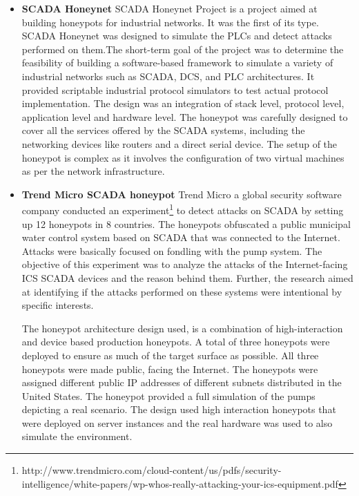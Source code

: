 \documentclass[article,msc=informatik,type=msc,colorback,accentcolor=tud9c]{tudthesis}
\begin{document}
	
	\vspace{5mm} 
	\begin{itemize}
	\item\textbf{SCADA Honeynet}
	SCADA Honeynet Project\cite{5198796} is a project aimed at building honeypots for industrial networks. It was the first of its type. \ac{SCADA} Honeynet was designed to simulate the \ac{PLC}s and detect attacks performed on them.The short-term goal of the project was to determine the feasibility of building a software-based framework to simulate a variety of industrial networks such as \ac{SCADA}, \ac{DCS}, and \ac{PLC} architectures. It provided scriptable industrial protocol simulators to test actual protocol implementation. The design was an integration of stack level, protocol level, application level and hardware level. The honeypot was carefully designed to cover all the services offered by the \ac{SCADA} systems, including the networking devices like routers and a direct serial device. The setup of the honeypot is complex as it involves the configuration of two virtual machines as per the network infrastructure.
	
	
	
	
	\item\textbf{Trend Micro SCADA honeypot}   Trend Micro a global security software company conducted an experiment\footnote{http://www.trendmicro.com/cloud-content/us/pdfs/security-intelligence/white-papers/wp-whos-really-attacking-your-ics-equipment.pdf} to detect attacks on \ac{SCADA} by setting up 12 honeypots in 8 countries. The honeypots obfuscated a public municipal water control system based on \ac{SCADA} that was connected to the Internet. Attacks were basically focused on fondling with the pump system.  The objective of this experiment was to analyze the attacks of the Internet-facing \ac{ICS} \ac{SCADA} devices and the reason behind them. Further, the research aimed at identifying if the attacks performed on these systems were intentional by specific interests.
         
  	The honeypot architecture design used, is a combination of high-interaction and device based production honeypots. A total of three honeypots were deployed to ensure as much of the target surface as possible. All three honeypots were made public, facing the Internet. The honeypots were assigned different public \ac{IP} addresses of different subnets distributed in the United States. The honeypot provided a full simulation of the pumps depicting a real scenario. The design used high interaction honeypots that were deployed on server instances and the real hardware was used to also simulate the environment. 
  	 

\end{itemize}
\end{document}
